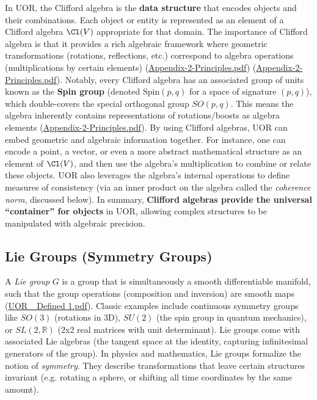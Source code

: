 \documentclass[12pt]{article}
\begin{document}
In UOR, the Clifford algebra is the \textbf{data structure} that encodes objects and their combinations. Each object or entity is represented as an element of a Clifford algebra $\Cl(V)$ appropriate for that domain. The importance of Clifford algebra is that it provides a rich algebraic framework where geometric transformations (rotations, reflections, etc.) correspond to algebra operations (multiplications by certain elements) (\href{file://file-KHyFhnFGcNX7Hyf3H7G9jk#:~:text=Clifford%20Algebra%20Framework%20,Notably%2C%20the%20Spin}{Appendix-2-Principles.pdf}) (\href{file://file-KHyFhnFGcNX7Hyf3H7G9jk#:~:text=V%20%28rotations%2C%20reflections%2C%20etc,V%20%29%20to%20%E2%80%9Crotate%E2%80%9D}{Appendix-2-Principles.pdf}). Notably, every Clifford algebra has an associated group of units known as the \textbf{Spin group} (denoted $\mathrm{Spin}(p,q)$ for a space of signature $(p,q)$), which double-covers the special orthogonal group $SO(p,q)$. This means the algebra inherently contains representations of rotations/boosts as algebra elements (\href{file://file-KHyFhnFGcNX7Hyf3H7G9jk#:~:text=V%20%28rotations%2C%20reflections%2C%20etc,V%20%29%20to%20%E2%80%9Crotate%E2%80%9D}{Appendix-2-Principles.pdf}). By using Clifford algebras, UOR can embed geometric and algebraic information together. For instance, one can encode a point, a vector, or even a more abstract mathematical structure as an element of $\Cl(V)$, and then use the algebra’s multiplication to combine or relate these objects. UOR also leverages the algebra’s internal operations to define measures of consistency (via an inner product on the algebra called the \emph{coherence norm}, discussed below). In summary, \textbf{Clifford algebras provide the universal “container” for objects} in UOR, allowing complex structures to be manipulated with algebraic precision.

\subsection{Lie Groups (Symmetry Groups)}

A \emph{Lie group} $G$ is a group that is simultaneously a smooth differentiable manifold, such that the group operations (composition and inversion) are smooth maps (\href{file://file-XiorGa5Wu6KTrCZGytuVSc#:~:text=Lie%20Groups%3A%20A%20Lie%20group,Of}{UOR\_ Defined 1.pdf}). Classic examples include continuous symmetry groups like $SO(3)$ (rotations in 3D), $SU(2)$ (the spin group in quantum mechanics), or $SL(2,\mathbb{R})$ (2x2 real matrices with unit determinant). Lie groups come with associated Lie algebras (the tangent space at the identity, capturing infinitesimal generators of the group). In physics and mathematics, Lie groups formalize the notion of \emph{symmetry}. They describe transformations that leave certain structures invariant (e.g. rotating a sphere, or shifting all time coordinates by the same amount).
\end{document}

